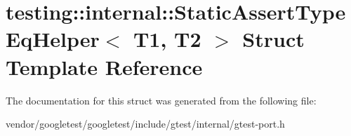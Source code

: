\hypertarget{structtesting_1_1internal_1_1_static_assert_type_eq_helper}{}\section{testing\+:\+:internal\+:\+:Static\+Assert\+Type\+Eq\+Helper$<$ T1, T2 $>$ Struct Template Reference}
\label{structtesting_1_1internal_1_1_static_assert_type_eq_helper}


The documentation for this struct was generated from the following file\+:\begin{DoxyCompactItemize}
\item 
vendor/googletest/googletest/include/gtest/internal/gtest-\/port.\+h\end{DoxyCompactItemize}
